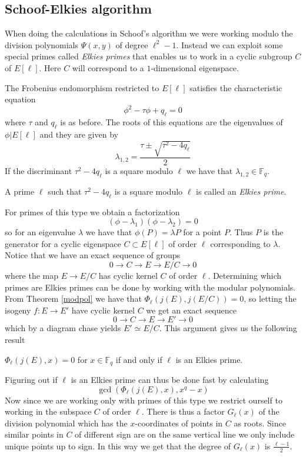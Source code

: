 \subsection{Schoof-Elkies algorithm}
When doing the calculations in Schoof's algorithm we were working modulo the division
polynomials $\Psi(x,y)$ of degree $\ell^2-1$. Instead we can exploit some special primes
called \emph{Elkies primes} that enables us to work in a cyclic subgroup $C$ of $E[\ell]$.
Here $C$ will correspond to a $1$-dimensional eigenspace.

The Frobenius endomorphism restricted to $E[\ell]$ satisfies the characteristic equation
$$ \phi^2 - \tau \phi + q_\ell = 0 $$
where $\tau$ and $q_\ell$ is as before. The roots of this equations are the eigenvalues
of $\phi | E[\ell]$ and they are given by
$$ \lambda_{1,2} = \frac{\tau \pm \sqrt{\tau^2 - 4 q_\ell}}{2} $$
If the discriminant $\tau^2 - 4 q_\ell$ is a square modulo $\ell$ we have that
$\lambda_{1,2} \in \mathbb{F}_q$.
\begin{mydef}
A prime $\ell$ such that $\tau^2 - 4 q_\ell$ is a square modulo $\ell$ is called
an \emph{Elkies prime}.
\end{mydef}
For primes of this type we obtain a factorization
$$ (\phi - \lambda_1)(\phi - \lambda_2) = 0 $$
so for an eigenvalue $\lambda$ we have that $\phi(P) = \lambda P$ for a point $P$. Thus
$P$ is the generator for a cyclic eigenspace $C \subset E[\ell]$ of order $\ell$
corresponding to $\lambda$.
Notice that we have an exact sequence of groups
$$ 0 \rightarrow C \rightarrow E \rightarrow E/C \rightarrow 0 $$
where the map $E \rightarrow E/C$ has cyclic kernel $C$ of order $\ell$.
Determining which primes are Elkies primes can be done by working with the
modular polynomials. From Theorem \ref{modpol} we have that $\Phi_\ell(j(E),j(E/C)) = 0$,
so letting the isogeny $f: E \rightarrow E'$ have cyclic kernel $C$ we get an exact
sequence
$$ 0 \rightarrow C \rightarrow E \rightarrow E' \rightarrow 0 $$
which by a diagram chase yields $ E' \simeq E/C $. This argument gives us the following result
\begin{prop}
 $ \Phi_\ell(j(E), x) = 0$ for $x \in \mathbb{F}_q$ if and only if $\ell$ is an Elkies
prime.
\end{prop}
Figuring out if $\ell$ is an Elkies prime can thus be done fast by calculating
$$\gcd(\Phi_\ell(j(E), x), x^q - x)$$
Now since we are working only with primes of this type we restrict ourself to working
in the subspace $C$ of order $\ell$. There is thus a factor $G_\ell(x)$ of the division polynomial
which has the $x$-coordinates of points in $C$ as roots. Since
similar points in $C$ of different sign are on the same vertical line we only include
unique points up to sign. In this way we get that the degree of $G_\ell(x)$ is $\frac{\ell-1}{2}$.

